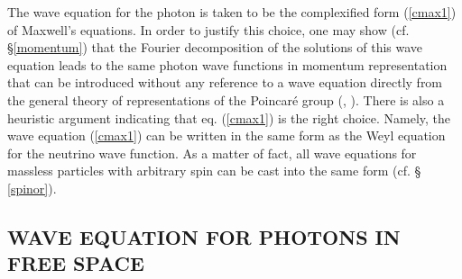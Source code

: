 \documentclass[11pt]{article}
\begin{document}
The wave equation for the photon is taken to be the complexified form
(\ref{cmax1}) of Maxwell's equations. In order to justify this choice, one
may show (cf. \S \ref{momentum}) that the Fourier decomposition of the
solutions of this wave equation leads to the same photon wave functions in
momentum representation that can be introduced without any reference to a
wave equation directly from the general theory of representations of the Poincar\'e
group (\cite{BW_48}, \cite{LM_62}). There is also a heuristic argument
indicating that eq. (\ref{cmax1}) is the right choice. Namely, the wave
equation (\ref{cmax1}) can be written in the same form as the Weyl equation
for the neutrino wave function. As a matter of fact, all wave equations for
massless particles with arbitrary spin can be cast into the same form (cf. \S
\ref{spinor}).

\subsection[WAVE EQUATION IN FREE SPACE]{WAVE EQUATION FOR PHOTONS IN FREE
SPACE}
\end{document}
